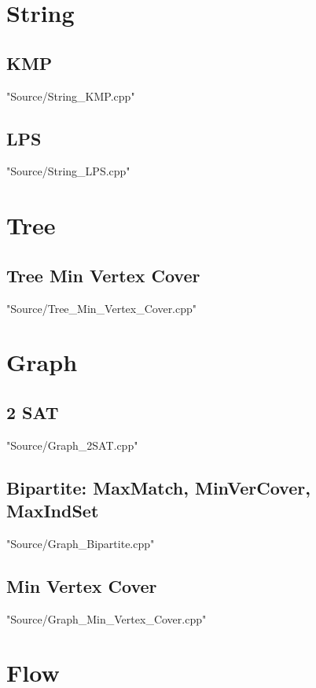\documentclass [12pt,twocolumn,oneside]{article}
\begin{document}
\newpage
\section{String}
\subsection{KMP}
 {"Source/String_KMP.cpp"}

\subsection{LPS}
 {"Source/String_LPS.cpp"}




\newpage
\section{Tree}
\subsection{Tree Min Vertex Cover}
 {"Source/Tree_Min_Vertex_Cover.cpp"}




\newpage
\section{Graph}
\subsection{2 SAT}
 {"Source/Graph_2SAT.cpp"}

\subsection{Bipartite: MaxMatch, MinVerCover, MaxIndSet}
 {"Source/Graph_Bipartite.cpp"}

\subsection{Min Vertex Cover}
 {"Source/Graph_Min_Vertex_Cover.cpp"}




\newpage
\section{Flow}
\end{document}
